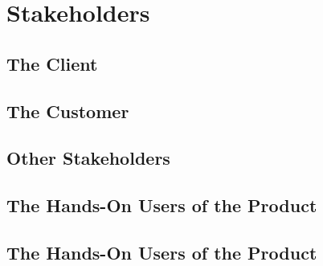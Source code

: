 \section{Stakeholders}
\subsection{The Client}
\subsection{The Customer}
\subsection{Other Stakeholders}
\subsection{The Hands-On Users of the Product}

\subsection{The Hands-On Users of the Product}\label{subsec:hands_on_users}
